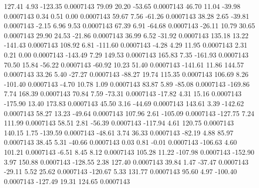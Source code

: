       127.41        4.93     -123.35     0.0007143
       79.09       20.20      -53.65     0.0007143
       46.70       11.04      -39.98     0.0007143
        0.34        0.51        0.00     0.0007143
       59.67        7.56      -61.26     0.0007143
       38.28        2.65      -39.81     0.0007143
       -2.15        6.96        9.53     0.0007143
       67.39        6.91      -64.68     0.0007143
      -26.11       10.79       30.65     0.0007143
       29.90       24.53      -21.86     0.0007143
       36.99        6.52      -31.92     0.0007143
      135.18       13.22     -141.43     0.0007143
      108.92        6.81     -111.60     0.0007143
       -4.28        4.29       11.95     0.0007143
        2.31        0.21        0.00     0.0007143
     -143.49        7.29      149.53     0.0007143
      165.83        7.35     -161.93     0.0007143
       70.50       15.84      -56.22     0.0007143
      -60.92       10.23       51.40     0.0007143
     -141.61       11.86      144.57     0.0007143
       33.26        5.40      -27.27     0.0007143
      -88.27       19.74      115.35     0.0007143
      106.69        8.26     -101.40     0.0007143
       -4.70       10.78        1.09     0.0007143
       83.87        5.89      -85.08     0.0007143
     -169.86        7.74      168.39     0.0007143
       70.84        7.59      -73.31     0.0007143
      -17.82        4.31       15.16     0.0007143
     -175.90       13.40      173.83     0.0007143
       45.50        3.16      -44.69     0.0007143
      143.61        3.39     -142.62     0.0007143
       58.27       13.23      -49.64     0.0007143
      107.96        2.61     -105.09     0.0007143
     -127.75        7.24      111.99     0.0007143
       58.51        2.81      -56.39     0.0007143
     -117.94        4.61      120.75     0.0007143
      140.15        1.75     -139.59     0.0007143
      -48.61        3.74       36.33     0.0007143
      -82.19        4.88       85.97     0.0007143
       38.45        5.31      -40.66     0.0007143
        0.03        0.81       -0.01     0.0007143
     -106.63        4.60      101.21     0.0007143
       -6.51        8.45        8.12     0.0007143
      105.28       11.22     -107.98     0.0007143
     -152.90        3.97      150.88     0.0007143
     -128.55        2.38      127.40     0.0007143
       39.84        1.47      -37.47     0.0007143
      -29.11        5.52       25.62     0.0007143
     -120.67        5.33      131.77     0.0007143
       95.60        4.97     -100.40     0.0007143
     -127.49       19.31      124.65     0.0007143
